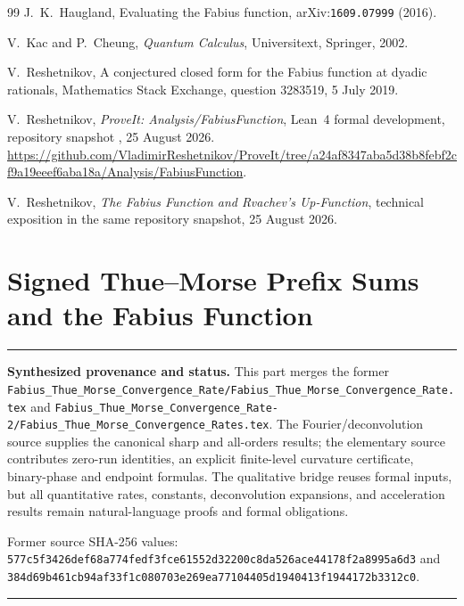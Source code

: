 \documentclass[11pt,oneside]{article}
\theoremstyle{definition}
\theoremstyle{remark}
\newenvironment{boxedremark}{%
  \par\smallskip\noindent\begin{center}\begin{minipage}{0.94\textwidth}%
  \color{black}\hrule\vspace{0.6em}\small
}{%
  \vspace{0.6em}\hrule\end{minipage}\end{center}\smallskip
}
\begin{document}
\begin{thebibliography}{99}
J.~K.~Haugland,
\newblock Evaluating the Fabius function,
\newblock arXiv:\nolinkurl{1609.07999} (2016).

V.~Kac and P.~Cheung,
\newblock \emph{Quantum Calculus},
\newblock Universitext, Springer, 2002.

V.~Reshetnikov,
\newblock A conjectured closed form for the Fabius function at dyadic rationals,
\newblock Mathematics Stack Exchange, question 3283519, 5 July 2019.

V.~Reshetnikov,
\newblock \emph{ProveIt: Analysis/FabiusFunction},
\newblock Lean~4 formal development, repository snapshot
  , 25 August 2026.
\newblock
\url{https://github.com/VladimirReshetnikov/ProveIt/tree/a24af8347aba5d38b8febf2cf9a19eeef6aba18a/Analysis/FabiusFunction}.

V.~Reshetnikov,
\newblock \emph{The Fabius Function and Rvachev's Up-Function},
\newblock technical exposition in the same repository snapshot, 25 August 2026.

\end{thebibliography}


\renewcommand{\arraystretch}{1}





\clearpage
\part{Signed Thue--Morse Prefix Sums and the Fabius Function}
\label{part:tmrates}
\begin{boxedremark}
\textbf{Synthesized provenance and status.} This part merges the former
\nolinkurl{Fabius_Thue_Morse_Convergence_Rate/Fabius_Thue_Morse_Convergence_Rate.tex}
and
\nolinkurl{Fabius_Thue_Morse_Convergence_Rate-2/Fabius_Thue_Morse_Convergence_Rates.tex}.
The Fourier/deconvolution source supplies the canonical sharp and all-orders results;
the elementary source contributes zero-run identities, an explicit finite-level
curvature certificate, binary-phase and endpoint formulas.  The qualitative bridge
reuses formal inputs, but all quantitative rates, constants, deconvolution expansions,
and acceleration results remain natural-language proofs and formal obligations.\par\smallskip
Former source SHA-256 values:
\nolinkurl{577c5f3426def68a774fedf3fce61552d32200c8da526ace44178f2a8995a6d3} and
\nolinkurl{384d69b461cb94af33f1c080703e269ea77104405d1940413f1944172b3312c0}.
\end{boxedremark}
\end{document}
